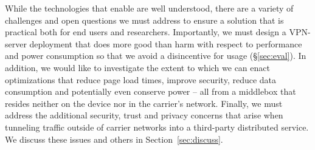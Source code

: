 While the technologies that enable \meddle are well understood, there
are a variety of challenges and open questions we must address to
ensure a solution that is practical both for end users and
researchers. Importantly, we must design a VPN-server deployment that
does more good than harm with respect to performance and power
consumption so that we avoid a disincentive for usage
(\S\ref{sec:eval}). In addition, we would like to investigate the
extent to which we can enact optimizations that reduce page load
times, improve security, reduce data consumption and potentially even
conserve power -- all from a middlebox that resides neither on the
device nor in the carrier's network. Finally, we must address the
additional security, trust and privacy concerns that arise when
tunneling traffic outside of carrier networks into a third-party
distributed service. We discuss these issues and others in
Section~\ref{sec:discuss}.



